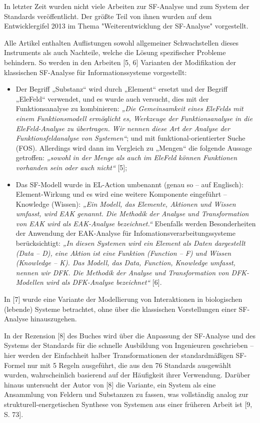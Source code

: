 \documentclass[11pt,a4paper]{article}
\begin{document}
In letzter Zeit wurden nicht viele Arbeiten zur SF-Analyse und zum System der
Standards veröffentlicht. Der größte Teil von ihnen wurden auf dem
Entwicklergifel 2013 im Thema "Weiterentwicklung der SF-Analyse" vorgestellt.

Alle Artikel enthalten Auflistungen sowohl allgemeiner Schwachstellen dieses
Instruments als auch Nachteile, welche die Lösung spezifischer Probleme
behindern.  So werden in den Arbeiten [5, 6] Varianten der Modifikation der
klassischen SF-Analyse für Informationssysteme vorgestellt:
\begin{itemize}
\item Der Begriff „Substanz“ wird durch „Element“ ersetzt und der Begriff
  „EleFeld“ verwendet, und es wurde auch versucht, dies mit der
  Funktionsanalyse zu kombinieren: \emph{„Die Gemeinsamkeit eines EleFelds mit
    einem Funktionsmodell ermöglicht es, Werkzeuge der Funktionsanalyse in die
    EleFeld-Analyse zu übertragen. Wir nennen diese Art der Analyse der
    Funktionsfeldanalyse von Systemen“}; und mit funktional-orientierter Suche
  (FOS).  Allerdings wird dann im Vergleich zu „Mengen“ die folgende Aussage
  getroffen: \emph{„sowohl in der Menge als auch im EleFeld können Funktionen
    vorhanden sein oder auch nicht“} [5];
\item Das SF-Modell wurde in EL-Action umbenannt (genau so -- auf Englisch):
  Element-Wirkung und es wird eine weitere Komponente eingeführt -- Knowledge
  (Wissen): \emph{„Ein Modell, das Elemente, Aktionen und Wissen umfasst, wird
    EAK genannt.  Die Methodik der Analyse und Transformation von EAK wird als
    EAK-Analyse bezeichnet.“} Ebenfalls werden Besonderheiten der Anwendung
  der EAK-Analyse für Infomationsverarbeitungssysteme berücksichtigt:
  \emph{„In diesen Systemen wird ein Element als Daten dargestellt (Data --
    D), eine Aktion ist eine Funktion (Function -- F) und Wissen (Knowledge --
    K). Das Modell, das Data, Function, Knowledge umfasst, nennen wir DFK.
    Die Methodik der Analyse und Transformation von DFK-Modellen wird als
    DFK-Analyse bezeichnet“} [6].
\end{itemize}
In [7] wurde eine Variante der Modellierung von Interaktionen in biologischen
(lebende) Systeme betrachtet, ohne über die klassischen Vorstellungen einer
SF-Analyse hinauszugehen.

In der Rezension [8] des Buches wird über die Anpassung der SF-Analyse und des
Systems der Standards für die schnelle Ausbildung von Ingenieuren geschrieben
-- hier werden der Einfachheit halber Transformationen der standardmäßigen
SF-Formel nur mit 5 Regeln ausgeführt, die aus den 76 Standards ausgewählt
wurden, wahrscheinlich basierend auf der Häufigkeit ihrer Verwendung. Darüber
hinaus untersucht der Autor von [8] die Variante, ein System als eine
Ansammlung von Feldern und Substanzen zu fassen, was vollständig analog zur
strukturell-energetischen Synthese von Systemen aus einer früheren Arbeit ist
[9, S. 73].
\end{document}
